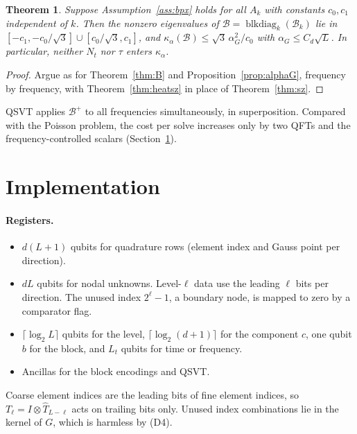 \documentclass[11pt,a4paper]{article}
\newcommand{\B}{\mathcal{B}}
\newtheorem{theorem}{Theorem}[section]
\theoremstyle{remark}
\begin{document}
\begin{theorem}\label{thm:heatB}
Suppose Assumption~\ref{ass:bpx} holds for all $A_k$ with constants $c_0,c_1$
independent of $k$. Then the nonzero eigenvalues of $\B=\operatorname{blkdiag}_k(\B_k)$ lie
in $[-c_1,-c_0/\sqrt3]\cup[c_0/\sqrt3,c_1]$, and
$\kappa_\alpha(\B)\le\sqrt3\,\alpha_G^2/c_0$ with $\alpha_G\le C_d\sqrt L$. In particular,
neither $N_t$ nor $\tau$ enters $\kappa_\alpha$.
\end{theorem}
\begin{proof}
Argue as for Theorem~\ref{thm:B} and Proposition~\ref{prop:alphaG},
frequency by frequency, with Theorem~\ref{thm:heatsz} in place of
Theorem~\ref{thm:sz}.
\end{proof}

QSVT applies $\B^+$ to all frequencies simultaneously, in superposition.
Compared with the Poisson problem, the cost per solve increases only by two
QFTs and the frequency-controlled scalars (Section~\ref{sec:impl}).

\section{Implementation}\label{sec:impl}

\paragraph{Registers.}
\begin{itemize}
\item $d(L+1)$ qubits for quadrature rows (element index and Gauss point
  per direction).
\item $dL$ qubits for nodal unknowns. Level-$\ell$ data use the leading $\ell$
  bits per direction. The unused index $2^\ell-1$, a boundary node, is mapped
  to zero by a comparator flag.
\item $\lceil\log_2L\rceil$ qubits for the level, $\lceil\log_2(d+1)\rceil$ for the
  component $c$, one qubit $b$ for the block, and $L_t$ qubits for time or
  frequency.
\item Ancillas for the block encodings and QSVT.
\end{itemize}
Coarse element indices are the leading bits of fine element indices, so
$T_\ell=I\otimes\widehat T_{L-\ell}$ acts on trailing bits only. Unused index
combinations lie in the kernel of $G$, which is harmless by (D4).
\end{document}
